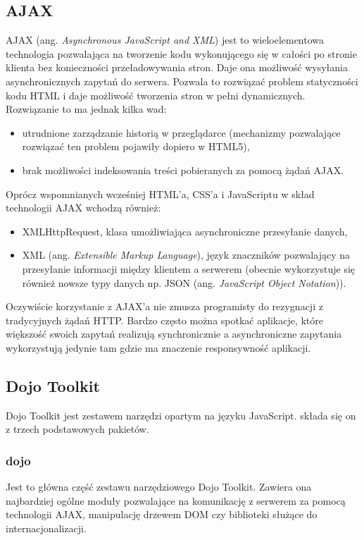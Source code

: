 \subsection[AJAX][AJAX]{AJAX}
\label{AJAX}
AJAX (ang. \textit{Asynchronous JavaScript and XML}) jest to wieloelementowa technologia pozwalająca na tworzenie kodu wykonującego się w całości po stronie klienta bez konieczności przeładowywania stron. Daje ona możliwość wysyłania asynchronicznych zapytań do serwera. Pozwala to rozwiązać problem statyczności kodu HTML i daje możliwość tworzenia stron w pełni dynamicznych. Rozwiązanie to ma jednak kilka wad:
\begin{itemize}
	\item utrudnione zarządzanie historią w przeglądarce (mechanizmy pozwalające rozwiązać ten problem pojawiły dopiero w HTML5),
	\item brak możliwości indeksowania treści pobieranych za pomocą żądań AJAX. 
\end{itemize}
Oprócz wspomnianych wcześniej HTML'a, CSS'a i JavaScriptu w skład technologii AJAX wchodzą również:
\begin{itemize}
	\item XMLHttpRequest, klasa umożliwiająca asynchroniczne przesyłanie danych,
	\item XML (ang. \textit{Extensible Markup Language}), język znaczników pozwalający na przesyłanie informacji między klientem a serwerem (obecnie wykorzystuje się również nowsze typy danych np. JSON (ang. \textit{JavaScript Object Notation})).
\end{itemize}
Oczywiście korzystanie z AJAX'a nie zmusza programisty do rezygnacji z tradycyjnych żądań HTTP. Bardzo często można spotkać aplikacje, które większość swoich zapytań realizują synchronicznie a asynchroniczne zapytania wykorzystują jedynie tam gdzie ma znaczenie responsywność aplikacji.

\subsection[Dojo Toolkit][Dojo Toolkit]{Dojo Toolkit}
Dojo Toolkit jest zestawem narzędzi opartym na języku JavaScript. składa się on z trzech podstawowych pakietów.

\subsubsection[dojo][dojo]{dojo}
Jest to główna część zestawu narzędziowego Dojo Toolkit. Zawiera ona najbardziej ogólne moduły pozwalające na komunikację z serwerem za pomocą technologii AJAX, manipulację drzewem DOM czy biblioteki służące do internacjonalizacji.

